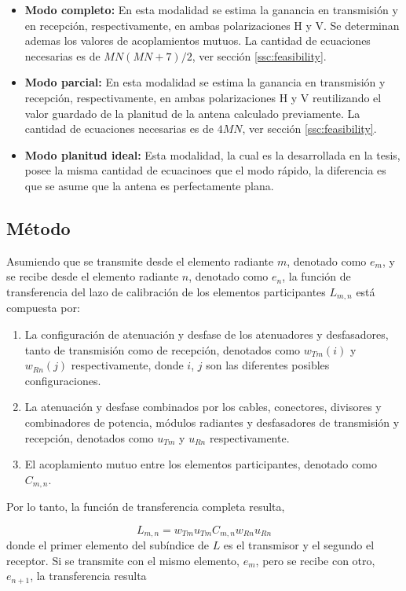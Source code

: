 \begin{itemize}
	\item \textbf{Modo completo:} En esta modalidad se estima la ganancia en transmisión y en recepción, respectivamente, en ambas
		polarizaciones H y V. Se determinan ademas los valores de acoplamientos mutuos. La cantidad de ecuaciones necesarias es de
		$MN(MN + 7)/2$, ver sección \ref{ssc:feasibility}.
	\item \textbf{Modo parcial:} En esta modalidad se estima la ganancia en transmisión y recepción, respectivamente, en ambas
		polarizaciones H y V reutilizando el valor guardado de la planitud de la antena calculado previamente. La cantidad de
		ecuaciones necesarias es de $4MN$, ver sección \ref{ssc:feasibility}.
	\item \textbf{Modo planitud ideal:} Esta modalidad, la cual es la desarrollada en la tesis, posee la misma cantidad de
		ecuacinoes que el modo rápido, la diferencia es que se asume que la antena es perfectamente plana.
\end{itemize}


\subsection{Método}

Asumiendo que se transmite desde el elemento radiante $m$, denotado como $e_m$, y se recibe desde el elemento radiante $n$,
denotado como $e_n$, la función de transferencia del lazo de calibración de los elementos participantes $L_{m,n}$ está
compuesta por:

\begin{enumerate}
	\item La configuración de atenuación y desfase de los atenuadores y desfasadores, tanto de transmisión como de recepción,
		denotados como $w_{Tm}(i)$ y $w_{Rn}(j)$ respectivamente, donde $i$, $j$ son las diferentes posibles configuraciones.
	\item La atenuación y desfase combinados por los cables, conectores, divisores y combinadores de potencia, módulos radiantes
		y desfasadores de transmisión y recepción, denotados como $u_{Tm}$ y $u_{Rn}$ respectivamente.
	\item El acoplamiento mutuo entre los elementos participantes, denotado como $C_{m, n}$.
\end{enumerate}

Por lo tanto, la función de transferencia completa resulta,

\begin{equation}
	L_{m,n} = w_{Tm} u_{Tm} C_{m,n} w_{Rn} u_{Rn}
	\label{eq:transfer_mn}
\end{equation}
donde el primer elemento del subíndice de $L$ es el transmisor y el segundo el receptor. Si se transmite con el mismo elemento,
$e_m$, pero se recibe con otro, $e_{n + 1}$, la transferencia resulta

